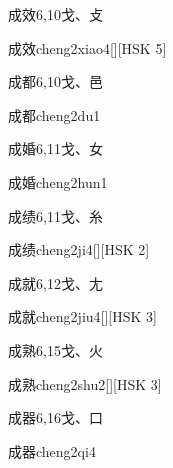 \begin{entry}{成效}{6,10}{⼽、⽁}
  \begin{phonetics}{成效}{cheng2xiao4}[][HSK 5]
  \end{phonetics}
\end{entry}

\begin{entry}{成都}{6,10}{⼽、⾢}
  \begin{phonetics}{成都}{cheng2du1}
  \end{phonetics}
\end{entry}

\begin{entry}{成婚}{6,11}{⼽、⼥}
  \begin{phonetics}{成婚}{cheng2hun1}
  \end{phonetics}
\end{entry}

\begin{entry}{成绩}{6,11}{⼽、⽷}
  \begin{phonetics}{成绩}{cheng2ji4}[][HSK 2]
  \end{phonetics}
\end{entry}

\begin{entry}{成就}{6,12}{⼽、⼪}
  \begin{phonetics}{成就}{cheng2jiu4}[][HSK 3]
  \end{phonetics}
\end{entry}

\begin{entry}{成熟}{6,15}{⼽、⽕}
  \begin{phonetics}{成熟}{cheng2shu2}[][HSK 3]
  \end{phonetics}
\end{entry}

\begin{entry}{成器}{6,16}{⼽、⼝}
  \begin{phonetics}{成器}{cheng2qi4}
  \end{phonetics}
\end{entry}


